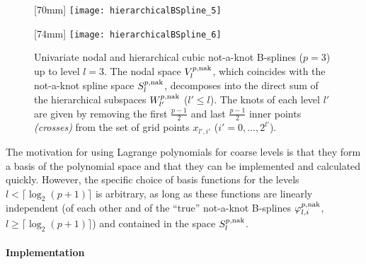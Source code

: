 \begin{figure}
  [70mm]{%
    \texttt{[image: hierarchicalBSpline\_5]}%
  }%
  \hfill%
  \hfill%
  [74mm]{%
    \texttt{[image: hierarchicalBSpline\_6]}%
  }%
  \caption{%
    Univariate nodal and hierarchical cubic not-a-knot B-splines ($p = 3$)
    up to level $l = 3$.
    The nodal space $V_l^{p,\mathrm{nak}}$,
    which coincides with the not-a-knot spline space $S_l^{p,\mathrm{nak}}$,
    decomposes into the direct sum
    of the hierarchical subspaces $W_{l'}^{p,\mathrm{nak}}$ ($l' \le l$).
    The knots of each level $l'$ are given by removing the
    first $\tfrac{p-1}{2}$ and last $\tfrac{p-1}{2}$
    inner points \emph{(crosses)}
    from the set of grid points $x_{l',i'}$
    ($i' = 0, \dotsc, 2^{l'}$).%
  }%
  \label{fig:notAKnotBSpline}%
\end{figure}

The motivation for using Lagrange polynomials for coarse levels
is that they form a basis of the polynomial space
and that they can be implemented and calculated quickly.
However, the specific choice of basis functions for the levels
$l < \lceil\log_2(p + 1)\rceil$ is arbitrary,
as long as these functions are linearly independent
(of each other and of the ``true'' not-a-knot B-splines
$\varphi_{l,i}^{p,\mathrm{nak}}$, $l \ge \lceil\log_2(p+1)\rceil$)
and contained in the space $S_l^{p,\mathrm{nak}}$.

\paragraph{Implementation}

